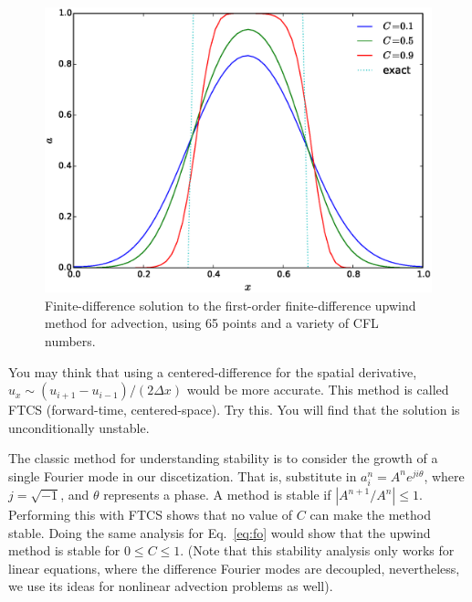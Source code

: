\begin{figure}[t]
\centering
\includegraphics[width=0.8\linewidth]{fdadvect}
\caption[First-order finite-difference solution to linear advection]
{\label{fig:fdadvect} Finite-difference solution to the first-order
finite-difference upwind method for advection, using 65 points and
a variety of CFL numbers.}
\end{figure}

\begin{exercise}
{You may think that using a centered-difference for
  the spatial derivative, $u_x \sim (u_{i+1} - u_{i-1})/(2 \Delta x)$
  would be more accurate.  This method is called FTCS (forward-time,
  centered-space).  Try this.  You will find that the solution is
  unconditionally unstable.  }
\end{exercise}

The classic method for understanding stability is to consider the growth 
of a single Fourier mode in our discetization.  That is, substitute in
$a_i^n = A^n e^{ji\theta}$, where $j = \sqrt{-1}$, and $\theta$ represents a
phase.  A method is stable if $|A^{n+1}/A^n| \le 1$.  Performing this
with FTCS shows that no value of $C$ can make the method stable.
Doing the same analysis for Eq.~\ref{eq:fo} would show that the upwind
method is stable for $0\le C \le 1$. 
(Note that this stability analysis only works for linear equations, where
the difference Fourier modes are decoupled, nevertheless, we use its
ideas for nonlinear advection problems as well).

